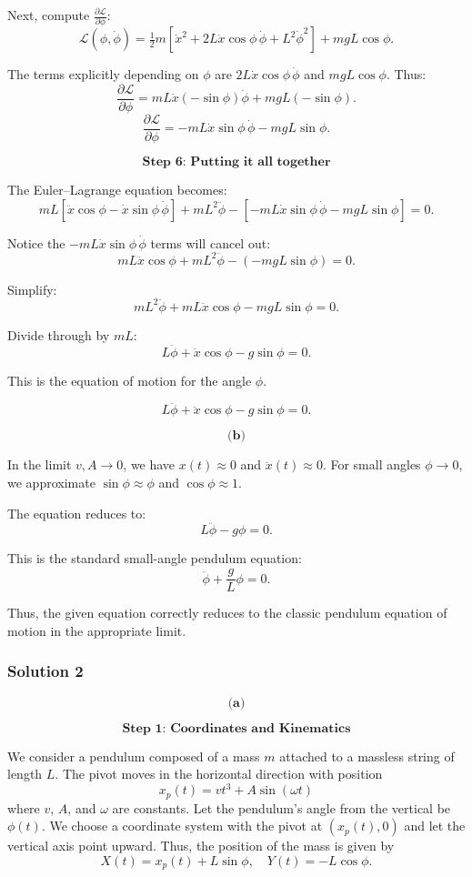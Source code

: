 \documentclass{article}
\begin{document}
Next, compute \(\frac{\partial \mathcal{L}}{\partial \phi}\):
\[
\mathcal{L}(\phi,\dot{\phi}) = \tfrac{1}{2}m[\dot{x}^2 + 2L\dot{x}\cos\phi\,\dot{\phi} + L^2\dot{\phi}^2] + mgL\cos\phi.
\]

The terms explicitly depending on \(\phi\) are \(2L\dot{x}\cos\phi\,\dot{\phi}\) and \(mgL\cos\phi\). Thus:
\[
\frac{\partial \mathcal{L}}{\partial \phi} = mL\dot{x}(-\sin\phi)\dot{\phi} + mgL(-\sin\phi).
\]
\[
\frac{\partial \mathcal{L}}{\partial \phi} = -mL\dot{x}\sin\phi\,\dot{\phi} - mgL\sin\phi.
\]

\[
\textbf{Step 6: Putting it all together}
\]

The Euler–Lagrange equation becomes:
\[
mL[\ddot{x}\cos\phi - \dot{x}\sin\phi\,\dot{\phi}] + mL^2\ddot{\phi} - [-mL\dot{x}\sin\phi\,\dot{\phi} - mgL\sin\phi] = 0.
\]

Notice the \(-mL\dot{x}\sin\phi\,\dot{\phi}\) terms will cancel out:
\[
mL\ddot{x}\cos\phi + mL^2\ddot{\phi} - (-mgL\sin\phi) = 0.
\]

Simplify:
\[
mL^2\ddot{\phi} + mL\ddot{x}\cos\phi - mgL\sin\phi = 0.
\]

Divide through by \( mL \):
\[
L\ddot{\phi} + \ddot{x}\cos\phi - g\sin\phi = 0.
\]

This is the equation of motion for the angle \(\phi\).

\[
\boxed{L\ddot{\phi} + \ddot{x}\cos\phi - g\sin\phi = 0.}
\]

\[
\textbf{(b)}
\]

In the limit \( v, A \to 0 \), we have \( x(t) \approx 0 \) and \(\ddot{x}(t) \approx 0 \). For small angles \(\phi \to 0\), we approximate \(\sin\phi \approx \phi\) and \(\cos\phi \approx 1\).

The equation reduces to:
\[
L\ddot{\phi} - g\phi = 0.
\]

This is the standard small-angle pendulum equation:
\[
\boxed{\ddot{\phi} + \frac{g}{L}\phi = 0.}
\]

Thus, the given equation correctly reduces to the classic pendulum equation of motion in the appropriate limit.

\subsubsection{Solution 2}

\[
\textbf{(a)}
\]

\[
\textbf{Step 1: Coordinates and Kinematics}
\]

We consider a pendulum composed of a mass $m$ attached to a massless string of length $L$. The pivot moves in the horizontal direction with position
\[
x_p(t) = vt^3 + A\sin(\omega t)
\]
where $v$, $A$, and $\omega$ are constants. Let the pendulum's angle from the vertical be $\phi(t)$. We choose a coordinate system with the pivot at $(x_p(t),0)$ and let the vertical axis point upward. Thus, the position of the mass is given by
\[
X(t) = x_p(t) + L\sin\phi, \quad Y(t) = -L\cos\phi.
\]
\end{document}
